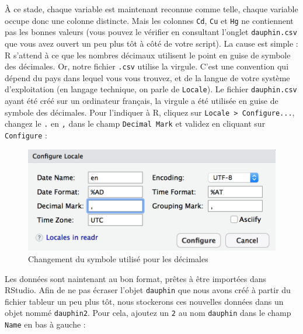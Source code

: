 \documentclass[a4paperpaper,]{article}
\theoremstyle{definition}
\theoremstyle{definition}
\theoremstyle{definition}
\theoremstyle{remark}
\begin{document}
À ce stade, chaque variable est maintenant reconnue comme telle, chaque
variable occupe donc une colonne distincte. Mais les colonnes
\texttt{Cd}, \texttt{Cu} et \texttt{Hg} ne contiennent pas les bonnes
valeurs (vous pouvez le vérifier en consultant l'onglet
\texttt{dauphin.csv} que vous avez ouvert un peu plus tôt à côté de
votre script). La cause est simple : R s'attend à ce que les nombres
décimaux utilisent le point en guise de symbole des décimales. Or, notre
fichier \texttt{.csv} utilise la virgule. C'est une convention qui
dépend du pays dans lequel vous vous trouvez, et de la langue de votre
système d'exploitation (en langage technique, on parle de
\texttt{Locale}). Le fichier \texttt{dauphin.csv} ayant été créé sur un
ordinateur français, la virgule a été utilisée en guise de symbole des
décimales. Pour l'indiquer à R, cliquez sur
\texttt{Locale\ \textgreater{}\ Configure...}, changez le \texttt{.} en
\texttt{,} dans le champ \texttt{Decimal\ Mark} et validez en cliquant
sur \texttt{Configure} :

\begin{figure}[htpb]

{\centering \includegraphics[width=0.5\linewidth]{images/importcsv3} 

}

\caption{Changement du symbole utilisé pour les décimales}\label{fig:importcsv3}
\end{figure}

Les données sont naintenant au bon format, prêtes à être importées dans
RStudio. Afin de ne pas écraser l'objet \texttt{dauphin} que nous avons
créé à partir du fichier tableur un peu plus tôt, nous stockerons ces
nouvelles données dans un objet nommé \texttt{dauphin2}. Pour cela,
ajoutez un \texttt{2} au nom \texttt{dauphin} dans le champ
\texttt{Name} en bas à gauche :
\end{document}
